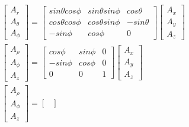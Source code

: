 \documentclass[10pt,letterpaper]{report}
\begin{document}
  \begin{equation*}
      \begin{split}
        &\begin{bmatrix}
            A_r \\
            A_{\theta} \\
            A_{\phi}
          \end{bmatrix} 
          =
          \begin{bmatrix}
            sin \theta cos \phi  & sin \theta sin \phi & cos \theta \\
            cos \theta cos \phi  & cos \theta sin \phi & -sin \theta \\
            -sin \phi            & cos \phi            & 0
          \end{bmatrix} 
          \begin{bmatrix}
            A_x \\
            A_y \\
            A_z
          \end{bmatrix} \\
        &\begin{bmatrix}
          A_{\rho} \\
          A_{\phi} \\
          A_z
          \end{bmatrix} 
          =
          \begin{bmatrix}
          cos \phi  & sin \phi & 0 \\
          -sin \phi & cos \phi & 0 \\
          0         & 0        & 1
          \end{bmatrix} 
          \begin{bmatrix}
            A_x \\
            A_y \\
            A_z
          \end{bmatrix} \\
        &\begin{bmatrix}
          A_{\rho} \\
          A_{\phi} \\
          A_z
          \end{bmatrix} 
          =
          \begin{bmatrix}

\end{bmatrix}
\end{split}
\end{equation*}
\end{document}
